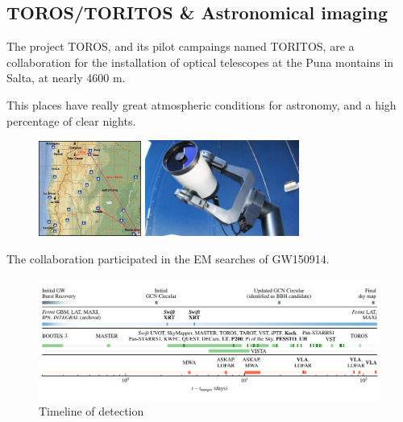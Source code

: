 \documentclass[10pt]{beamer}
\begin{document}
\subsection{TOROS/TORITOS \& Astronomical imaging}
\begin{frame}
The project TOROS, and its pilot campaings named 
TORITOS, are a collaboration for the installation of optical
telescopes at the Puna montains in Salta, at nearly 4600 m.

This places have really great atmospheric conditions for astronomy, 
and a high percentage of clear nights.

\begin{figure}
 \centering
 \includegraphics[bb=0 0 400 372, width=0.3\textwidth]{./slides/plots/Site.jpg}
 \includegraphics[bb=0 0 159 99, width=0.45\textwidth]{./slides/plots/toritos_1.png}
\end{figure}
\end{frame}
\begin{frame}
 The collaboration participated in the EM searches of GW150914.
 \begin{figure}
 \centering
 \includegraphics[width=\textwidth]{./slides/plots/160208492v4/timeline.pdf}
 \caption{Timeline of detection}
 \label{fig:timeline}
\end{figure}
\end{frame}
\end{document}
